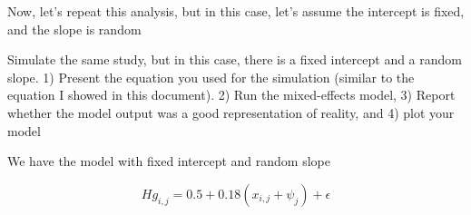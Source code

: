 \documentclass[
  letterpaper,
  DIV=11,
  numbers=noendperiod]{scrartcl}
\begin{document}
Now, let's repeat this analysis, but in this case, let's assume the
intercept is fixed, and the slope is random

\begin{tcolorbox}[enhanced jigsaw, title=\textcolor{quarto-callout-important-color}{\faExclamation}\hspace{0.5em}{Question 1: points:10}, rightrule=.15mm, breakable, colbacktitle=quarto-callout-important-color!10!white, leftrule=.75mm, colback=white, bottomrule=.15mm, toprule=.15mm, opacitybacktitle=0.6, colframe=quarto-callout-important-color-frame, left=2mm, coltitle=black, opacityback=0, bottomtitle=1mm, toptitle=1mm, titlerule=0mm, arc=.35mm]

Simulate the same study, but in this case, there is a fixed intercept
and a random slope. 1) Present the equation you used for the simulation
(similar to the equation I showed in this document). 2) Run the
mixed-effects model, 3) Report whether the model output was a good
representation of reality, and 4) plot your model

\end{tcolorbox}

We have the model with fixed intercept and random slope

\[
Hg_{i,j} = 0.5+0.18(x_{i,j}+\psi_j) + \epsilon
\]\\
\end{document}
